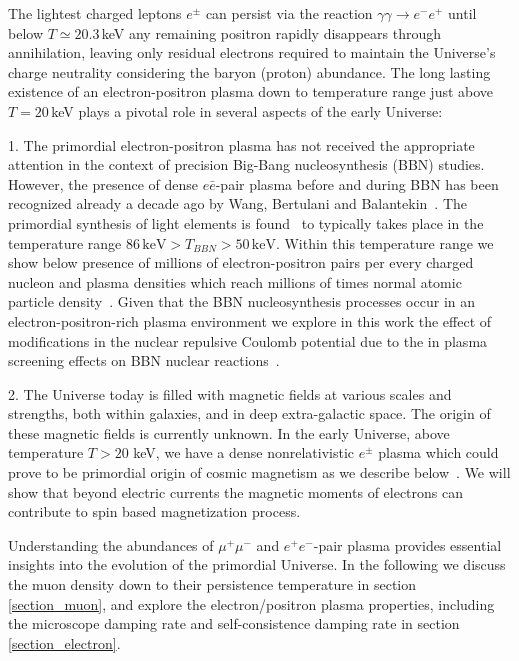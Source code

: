 The lightest charged leptons $e^\pm$ can persist via the reaction $\gamma\gamma\to e^-e^+$ until below $T\simeq 20.3$\,keV any remaining positron rapidly disappears through annihilation, leaving only residual electrons required to maintain the Universe's charge neutrality considering the baryon (proton) abundance. The long lasting existence of an electron-positron plasma down to temperature range just above $T=20$\,keV plays a pivotal role in several aspects of the early Universe: 

1. The primordial electron-positron plasma has not received the appropriate attention in the context of precision Big-Bang nucleosynthesis (BBN) studies. However, the presence of dense $e\bar e$-pair plasma before and during BBN has been recognized already a decade ago by Wang, Bertulani and Balantekin~\cite{Wang:2010px}. The primordial synthesis of light elements is found~\cite{Pitrou:2018cgg} to typically takes place in the temperature range $86\,\mathrm{keV}>T_{BBN}>50\,\mathrm{keV}$. Within this temperature range we show below presence of millions of electron-positron pairs per every charged nucleon and plasma densities which reach millions of times normal atomic particle density~\cite{Yang:2024ret,Grayson:2023flr}. Given that the BBN nucleosynthesis processes occur in an electron-positron-rich plasma environment we explore in this work the effect of modifications in the nuclear repulsive Coulomb potential due to the in plasma screening effects on BBN nuclear reactions~\cite{Grayson:2024okq,Grayson:2024uwg}.  

2. The Universe today is filled with magnetic fields at various scales and strengths, both within galaxies, and in deep extra-galactic space. The origin of these magnetic fields is currently unknown. In the early Universe, above temperature $T>20$ keV, we have a dense nonrelativistic  $e^\pm$ plasma which could prove to be primordial origin of cosmic magnetism as we describe below~\cite{Steinmetz:2023ucp,Rafelski:2023emw,Steinmetz:2023nsc}. We will show that beyond electric currents the magnetic moments of electrons can contribute to spin based magnetization process.

Understanding the abundances of $\mu^+\mu^-$ and $e^+e^-$-pair plasma provides essential insights into the evolution of the primordial Universe.  In the following we discuss the muon density down to their persistence temperature in section \ref{section_muon}, and explore the electron/positron plasma properties, including the microscope damping rate and self-consistence damping rate in section \ref{section_electron}.

